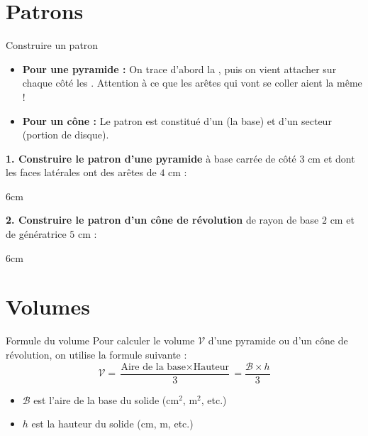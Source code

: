\documentclass[a4paper]{book}
\begin{document}
\section{Patrons}
    
    \begin{methodeTitre}{Construire un patron}
        \begin{itemize}
            \item \textbf{Pour une pyramide :} On trace d'abord la \points[5], puis on vient attacher sur chaque côté les \points[10]. Attention à ce que les arêtes qui vont se coller aient la même \points[6] !
            \item \textbf{Pour un cône :} Le patron est constitué d'un \points[5] (la base) et d'un secteur \points[6] (portion de disque).
        \end{itemize}
    \end{methodeTitre}
    
    \begin{exemple}
        \textbf{1. Construire le patron d'une pyramide} à base carrée de côté $3\text{ cm}$ et dont les faces latérales ont des arêtes de $4\text{ cm}$ :
    \end{exemple}
    \begin{ZoneReponse}{6cm}
    \end{ZoneReponse}
    
    \begin{exemple}
        \textbf{2. Construire le patron d'un cône de révolution} de rayon de base $2\text{ cm}$ et de génératrice $5\text{ cm}$ :
    \end{exemple}
    \begin{ZoneReponse}{6cm}
    \end{ZoneReponse}

\section{Volumes}

    \begin{proprieteTitre}{Formule du volume}
        Pour calculer le volume $\mathcal{V}$ d'une pyramide ou d'un cône de révolution, on utilise la formule suivante :
        \[ \mathcal{V} = \frac{\text{Aire de la base} \times \text{Hauteur}}{3} = \frac{\mathcal{B} \times h}{3} \]
        \begin{itemize}
            \item $\mathcal{B}$ est l'aire de la base du solide ($\text{cm}^2$, $\text{m}^2$, etc.)
            \item $h$ est la hauteur du solide ($\text{cm}$, $\text{m}$, etc.)
        \end{itemize}
    \end{proprieteTitre}
    
\end{document}
